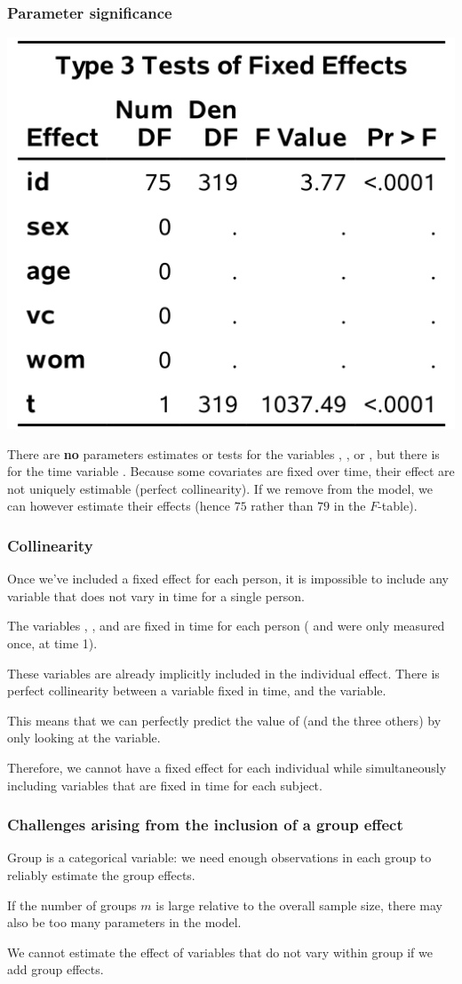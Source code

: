 \documentclass{beamer}
\begin{document}
 \begin{frame}
\frametitle{Parameter significance}
\begin{center}
\includegraphics[width=0.4\linewidth]{img/c6/slides7-e03}
\end{center}
{\footnotesize 


There are \textbf{no} parameters estimates or tests for the variables , ,  or , but there is for the time variable . 
Because some covariates are fixed over time, their effect are not uniquely estimable (perfect collinearity). If we remove  from the model, we can however estimate their effects (hence $75$  rather than $79$ in the $F$-table).

}
\end{frame}


\begin{frame}[fragile]
\frametitle{Collinearity}
\bi
\item  Once we've included a fixed effect for each person, \alert{it is impossible to include any variable that does not vary in time for a single person}. 
\item The variables , ,  and  are fixed in time for each person ( and  were only measured once, at time 1). 
\item These variables are already implicitly included in the individual effect. There is \alert{perfect collinearity} between a variable fixed in time, and the  variable. 
\item This means that we can perfectly predict the value of  (and the three others) by only looking at the  variable. 
\item Therefore, we cannot have a fixed effect for each individual while simultaneously including variables that are fixed in time for each subject.
\ei
\end{frame}
 \begin{frame}
 \frametitle{Challenges arising from the inclusion of a group effect}
 
 \bi 
 \item Group is a categorical variable: we need enough observations in each group to reliably estimate the group effects.
 \item If the number of groups $m$ is large relative to the overall sample size, there may also be too many parameters in the model. 
 \item We cannot estimate the effect of variables that do not vary within group if we add group effects.
  \ei
\end{frame}
\end{document}
